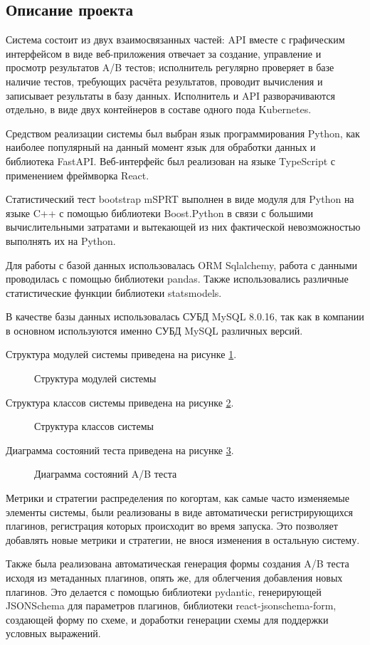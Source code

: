 \documentclass[../document.tex]{subfiles}
\begin{document}
	\subsection{Описание проекта}
	\par Система состоит из двух взаимосвязанных частей: API вместе с графическим интерфейсом в виде веб-приложения отвечает за создание, управление и просмотр результатов A/B тестов; исполнитель регулярно проверяет в базе наличие тестов, требующих расчёта результатов, проводит вычисления и записывает результаты в базу данных. Исполнитель и API разворачиваются отдельно, в виде двух контейнеров в составе одного пода Kubernetes.
	\par Средством реализации системы был выбран язык программирования Python, как наиболее популярный на данный момент язык для обработки данных и библиотека FastAPI. Веб-интерфейс был реализован на языке TypeScript с применением фреймворка React.
	\par Статистический тест bootstrap mSPRT выполнен в виде модуля для Python на языке C++ с помощью библиотеки Boost.Python в связи с большими вычислительными затратами и вытекающей из них фактической невозможностью выполнять их на Python.
	\par Для работы с базой данных использовалась ORM Sqlalchemy, работа с данными проводилась с помощью библиотеки pandas. Также использовались различные статистические функции библиотеки statsmodels.
	\par В качестве базы данных использовалась СУБД MySQL 8.0.16, так как в компании в основном используются именно СУБД MySQL различных версий.
	\par Структура модулей системы приведена на рисунке \ref{image:module_plot}.
	\begin{figure}[H]
		\caption{\label{image:module_plot}Структура модулей системы}
	\end{figure}
	\par Структура классов системы приведена на рисунке \ref{image:class_plot}.
	\begin{figure}[H]
		\caption{\label{image:class_plot}Структура классов системы}
	\end{figure}
	\par Диаграмма состояний теста приведена на рисунке \ref{image:test_state_plot}.
	\begin{figure}[H]
		\caption{\label{image:test_state_plot}Диаграмма состояний A/B теста}
	\end{figure}
	\par Метрики и стратегии распределения по когортам, как самые часто изменяемые элементы системы, были реализованы в виде автоматически регистрирующихся плагинов, регистрация которых происходит во время запуска. Это позволяет добавлять новые метрики и стратегии, не внося изменения в остальную систему.
	\par Также была реализована автоматическая генерация формы создания A/B теста исходя из метаданных плагинов, опять же, для облегчения добавления новых плагинов. Это делается с помощью библиотеки pydantic, генерирующей JSONSchema для параметров плагинов, библиотеки react-jsonschema-form, создающей форму по схеме, и доработки генерации схемы для поддержки условных выражений.	
\end{document}
